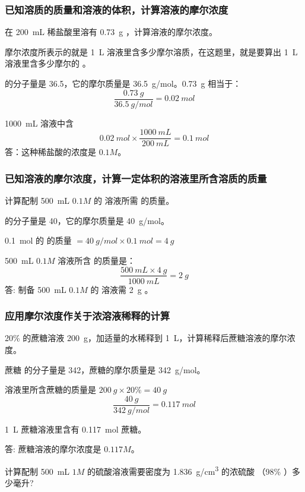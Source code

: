 \subsubsection{已知溶质的质量和溶液的体积，计算溶液的摩尔浓度}
\begin{example}
在 \qty{200}{mL} 稀盐酸里溶有 \qty{0.73}{g} ，计算溶液的摩尔浓度。
\end{example}
摩尔浓度所表示的就是 \qty{1}{L} 溶液里含多少摩尔溶质，在这题里，就是要算出 \qty{1}{L} 溶液里含多少摩尔的 。
\begin{solution}
 的分子量是 36.5，它的摩尔质量是 \qty{36.5}{g/mol}。\qty{0.73}{g}  相当于：
\[ \frac{\qty{0.73}{g}}{\qty{36.5}{g/mol}} = \qty{0.02}{mol}\]

\qty{1000}{mL} 溶液中含 
\[ \qty{0.02}{mol} \times \frac{\qty{1000}{mL}}{\qty{200}{mL}} = \qty{0.1}{mol}\]
答：这种稀盐酸的浓度是 $0.1M$。
\end{solution}

\subsubsection{已知溶液的摩尔浓度，计算一定体积的溶液里所含溶质的质量}
\begin{example}
  计算配制 \qty{500}{mL} $0.1M$ 的  溶液所需  的质量。
\end{example}
\begin{solution}
   的分子量是 40，它的摩尔质量是 \qty{40}{g/mol}。

  \qty{0.1}{mol} 的  的质量 $= \qty{40}{g/mol} \times \qty{0.1}{mol}=\qty{4}{g}$

  \qty{500}{mL} $0.1M$  溶液所含  的质量是：
  \[ \frac{\qty{500}{mL}\times\qty{4}{g}}{\qty{1000}{mL}} =\qty{2}{g}\]
  答: 制备 \qty{500}{mL} $0.1M$ 的  溶液需 \qty{2}{g} 。
\end{solution}

\subsubsection{应用摩尔浓度作关于浓溶液稀释的计算}
\begin{example}
  20\% 的蔗糖溶液 \qty{200}{g}，加适量的水稀释到 \qty{1}{L}，计算稀释后蔗糖溶液的摩尔浓度。
\end{example}
\begin{solution}
  蔗糖  的分子量是 342，蔗糖的摩尔质量是 \qty{342}{g/mol}。

  溶液里所含蔗糖的质量是 $\qty{200}{g} \times 20\% = \qty{40}{g}$
  \[\frac{\qty{40}{g}}{\qty{342}{g/mol}}=\qty{0.117}{mol}\]

  \qty{1}{L} 蔗糖溶液里含有 \qty{0.117}{mol} 蔗糖。

\noindent 答: 蔗糖溶液的摩尔浓度是 $0.117M$。
\end{solution}
\begin{example}
  计算配制 \qty{500}{mL} $1M$ 的硫酸溶液需要密度为 \qty{1.836}{g/cm^3} 的浓硫酸 （98\% ）多少毫升?
\end{example}

